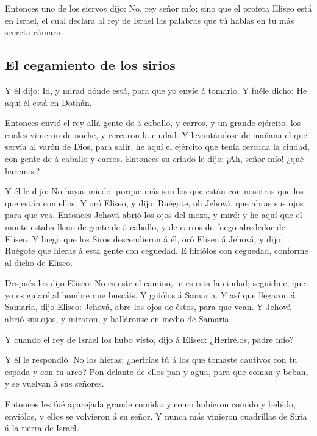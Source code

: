  Entonces uno de los siervos dijo: No, rey señor mío; sino
que el profeta Eliseo está en Israel, el cual declara al rey de Israel
las palabras que tú hablas en tu más secreta cámara.

\hypertarget{el-cegamiento-de-los-sirios}{%
\subsection{El cegamiento de los
sirios}\label{el-cegamiento-de-los-sirios}}

 Y él dijo: Id, y mirad dónde está, para que yo envíe á
tomarlo. Y fuéle dicho: He aquí él está en Dothán.

 Entonces envió el rey allá gente de á caballo, y carros, y
un grande ejército, los cuales vinieron de noche, y cercaron la ciudad.
 Y levantándose de mañana el que servía al varón de Dios,
para salir, he aquí el ejército que tenía cercada la ciudad, con gente
de á caballo y carros. Entonces su criado le dijo: ¡Ah, señor mío! ¿qué
haremos?

 Y él le dijo: No hayas miedo: porque más son los que están
con nosotros que los que están con ellos.  Y oró Eliseo, y
dijo: Ruégote, oh Jehová, que abras sus ojos para que vea. Entonces
Jehová abrió los ojos del mozo, y miró: y he aquí que el monte estaba
lleno de gente de á caballo, y de carros de fuego alrededor de Eliseo.
 Y luego que los Siros descendieron á él, oró Eliseo á
Jehová, y dijo: Ruégote que hieras á esta gente con ceguedad. E hiriólos
con ceguedad, conforme al dicho de Eliseo.

 Después les dijo Eliseo: No es este el camino, ni es esta
la ciudad; seguidme, que yo os guiaré al hombre que buscáis. Y guiólos á
Samaria.  Y así que llegaron á Samaria, dijo Eliseo:
Jehová, abre los ojos de éstos, para que vean. Y Jehová abrió sus ojos,
y miraron, y halláronse en medio de Samaria.

 Y cuando el rey de Israel los hubo visto, dijo á Eliseo:
¿Herirélos, padre mío?

 Y él le respondió: No los hieras; ¿herirías tú á los que
tomaste cautivos con tu espada y con tu arco? Pon delante de ellos pan y
agua, para que coman y beban, y se vuelvan á sus señores.

 Entonces les fué aparejada grande comida: y como hubieron
comido y bebido, enviólos, y ellos se volvieron á su señor. Y nunca más
vinieron cuadrillas de Siria á la tierra de Israel.

